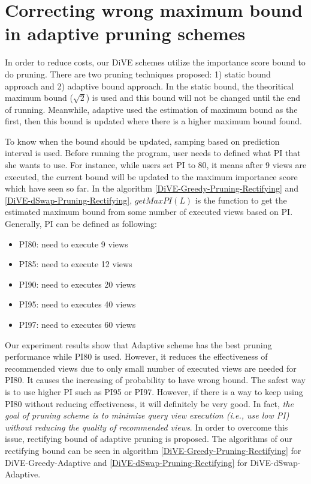\documentclass{article}
\begin{document}
\section{Correcting wrong maximum bound in adaptive pruning schemes}


In order to reduce costs, our DiVE schemes utilize the importance score bound to do pruning. There are two pruning techniques proposed: 1) static bound approach and 2) adaptive bound approach. In the static bound, the theoritical maximum bound ($ \sqrt{2} $) is used and this bound will not be changed until the end of running. Meanwhile, adaptive used the estimation of maximum bound as the first, then this bound is updated where there is a higher maximum bound found. 


To know when the bound should be updated, samping based on prediction interval is used. Before running the program, user needs to defined what PI that she wants to use. For instance, while users set PI to 80, it means after 9 views are executed, the current bound will be updated to the maximum importance score which have seen so far. In the algorithm \ref{DiVE-Greedy-Pruning-Rectifying} and \ref{DiVE-dSwap-Pruning-Rectifying}, $getMaxPI(L)$ is the function to get the estimated maximum bound from some number of executed views based on PI. Generally, PI can be defined as following: 

\begin{itemize}[noitemsep]
	\item PI80: need to execute 9 views
	\item PI85: need to execute 12 views
	\item PI90: need to executes 20 views
	\item PI95: need to executes 40 views
	\item PI97: need to executes 60 views
\end{itemize}


Our experiment results show that Adaptive scheme has the best pruning performance while PI80 is used. However, it reduces the effectiveness of recommended views due to only small number of executed views are needed for PI80. It causes the increasing of probability to have wrong bound. The safest way is to use higher PI such as PI95 or PI97. However, if there is a way to keep using PI80 without reducing effectiveness, it will definitely be very good. In fact, \textit{the goal of pruning scheme is to minimize query view execution (i.e., use low PI) without reducing the quality of recommended views}. In order to overcome this issue, rectifying bound of adaptive pruning is proposed. The algorithms of our rectifying bound can be seen in algorithm \ref{DiVE-Greedy-Pruning-Rectifying} for DiVE-Greedy-Adaptive and \ref{DiVE-dSwap-Pruning-Rectifying} for DiVE-dSwap-Adaptive. 
\end{document}
